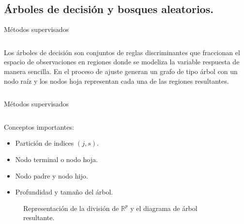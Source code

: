 \subsection{Árboles de decisión y bosques aleatorios.}
\begin{frame}{Métodos supervisados}
\begin{columns}
\begin{column}{0.9\textwidth}
\begin{defi}
Los árboles de decisión son conjuntos de reglas discriminantes que fraccionan el espacio de observaciones en regiones donde se modeliza la variable respuesta de manera sencilla. En el proceso de ajuste generan un grafo de tipo árbol con un nodo raíz y los nodos hoja representan cada una de las regiones resultantes. 
\end{defi}
\end{column}
\end{columns}
\end{frame}

\begin{frame}{Métodos supervisados}
\begin{columns}
\begin{column}{0.9\textwidth}
Conceptos importantes:
\begin{itemize}
\item Partición de indices $(j,s)$.
\item Nodo terminal o nodo hoja.
\item Nodo padre y nodo hijo.
\item Profundidad y tamaño del árbol.
\end{itemize}
\begin{center}
\begin{figure}[ht]
 \caption{Representación de la división de $\mathbb{R}^p$ y el diagrama de árbol \\resultante.}
 \label{f:MARC1}
\end{figure}
\end{center}
\end{column}
\end{columns}
\end{frame}
